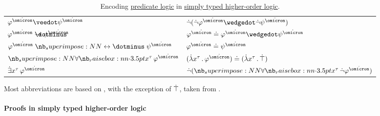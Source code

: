 \begin{definition}
\begin{table}
\begin{center}
\begin{tabular}{l l}
        \( \varphi^{\syn\omicron} \synvee \psi^{\syn\omicron} \)     & \( \synneg (\synneg \varphi^{\syn\omicron} \synwedge \synneg \psi^{\syn\omicron}) \)                                                                                                                                                   \\
        \( \varphi^{\syn\omicron} \synimplies \psi^{\syn\omicron} \) & \( \varphi^{\syn\omicron} \syneq \varphi^{\syn\omicron} \synwedge \psi^{\syn\omicron} \)                                                                                                                                               \\
        \( \varphi^{\syn\omicron} \syniff \psi^{\syn\omicron} \)     & \( \varphi^{\syn\omicron} \syneq \psi^{\syn\omicron} \)                                                                                                                                                                                \\
        \( \qforall {x^\tau} \varphi^{\syn\omicron} \)               & \( (\qabs {x^\tau} \varphi^{\syn\omicron}) \syneq (\qabs {x^\tau} \syntop) \)                                                                                                                                                          \\
        \( \qexists {x^\tau} \varphi^{\syn\omicron} \)               & \( \synneg (\qforall {x^\tau} \synneg \varphi^{\syn\omicron}) \)                                                                                                                                                                       \\
        \bottomrule
      \end{tabular}
    \end{center}

    \caption{Encoding \hyperref[rem:predicate_logic]{predicate logic} in \hyperref[def:simply_typed_hol]{simply typed higher-order logic}.}\label{tab:def:simply_typed_hol_abbreviations}
  \end{table}
\end{definition}
\begin{comments}
  \item Most abbreviations are based on , with the exception of \( \dot{\top} \), taken from .
\end{comments}

\paragraph{Proofs in simply typed higher-order logic}


